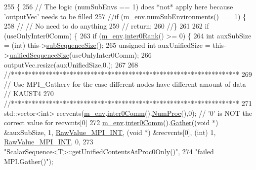 \begin{DoxyCode}
255 \{
256   \textcolor{comment}{// The logic (numSubEnvs == 1) does *not* apply here because 'outputVec' needs to be filled}
257   \textcolor{comment}{//if (m\_env.numSubEnvironments() == 1) \{}
258   \textcolor{comment}{//  // No need to do anything}
259   \textcolor{comment}{//  return;}
260   \textcolor{comment}{//\}}
261 
262   \textcolor{keywordflow}{if} (useOnlyInter0Comm) \{
263     \textcolor{keywordflow}{if} (\hyperlink{class_q_u_e_s_o_1_1_scalar_sequence_a71618cd6351b29361b437af68447a4c8}{m\_env}.\hyperlink{class_q_u_e_s_o_1_1_base_environment_ae106b5bb8a80b655b88b3a26b1e7c185}{inter0Rank}() >= 0) \{
264       \textcolor{keywordtype}{int} auxSubSize = (int) this->\hyperlink{class_q_u_e_s_o_1_1_scalar_sequence_a0288ea295eedc216a1617b3286f6f3a0}{subSequenceSize}();
265       \textcolor{keywordtype}{unsigned} \textcolor{keywordtype}{int} auxUnifiedSize = this->\hyperlink{class_q_u_e_s_o_1_1_scalar_sequence_a52829afc95e5c36e9db44f40854153b0}{unifiedSequenceSize}(useOnlyInter0Comm);
266       outputVec.resize(auxUnifiedSize,0.);
267 
268       \textcolor{comment}{//******************************************************************}
269       \textcolor{comment}{// Use MPI\_Gatherv for the case different nodes have different amount of data // KAUST4}
270       \textcolor{comment}{//******************************************************************}
271       std::vector<int> recvcnts(\hyperlink{class_q_u_e_s_o_1_1_scalar_sequence_a71618cd6351b29361b437af68447a4c8}{m\_env}.\hyperlink{class_q_u_e_s_o_1_1_base_environment_a689e4d140c74d495d97eb498714a4b82}{inter0Comm}().\hyperlink{class_q_u_e_s_o_1_1_mpi_comm_aa780721ae0fdeabc5a15e04cb0cad964}{NumProc}(),0); \textcolor{comment}{// '0' is NOT the
       correct value for recvcnts[0]}
272       \hyperlink{class_q_u_e_s_o_1_1_scalar_sequence_a71618cd6351b29361b437af68447a4c8}{m\_env}.\hyperlink{class_q_u_e_s_o_1_1_base_environment_a689e4d140c74d495d97eb498714a4b82}{inter0Comm}().\hyperlink{class_q_u_e_s_o_1_1_mpi_comm_a184a5e411afcfb6dc41e99fca9435045}{Gather}((\textcolor{keywordtype}{void} *) &auxSubSize, 1, 
      \hyperlink{_mpi_comm_8h_a1f067da7be967aa1ff144738cadd3e57}{RawValue\_MPI\_INT}, (\textcolor{keywordtype}{void} *) &recvcnts[0], (\textcolor{keywordtype}{int}) 1, 
      \hyperlink{_mpi_comm_8h_a1f067da7be967aa1ff144738cadd3e57}{RawValue\_MPI\_INT}, 0,
273                                 \textcolor{stringliteral}{"ScalarSequence<T>::getUnifiedContentsAtProc0Only()"},
274                                 \textcolor{stringliteral}{"failed MPI.Gather()"});

\end{DoxyCode}
